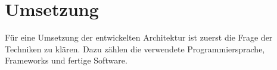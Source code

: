 \chapter{Umsetzung}

Für eine Umsetzung der entwickelten Architektur ist zuerst die Frage der Techniken zu klären.
Dazu zählen die verwendete Programmiersprache, Frameworks und fertige Software.







